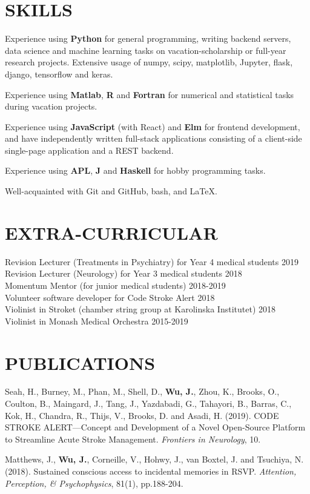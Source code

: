 \documentclass[margin]{res}
\begin{document}
\begin{resume}
\section{SKILLS}

Experience using {\bf Python} for general programming, writing backend servers, data science and machine learning tasks on vacation-scholarship or full-year research projects. Extensive usage of numpy, scipy, matplotlib, Jupyter, flask, django, tensorflow and keras.

Experience using {\bf Matlab}, {\bf R} and {\bf Fortran} for numerical and statistical tasks during vacation projects.

Experience using {\bf JavaScript} (with React) and {\bf Elm} for frontend development, and have independently written full-stack applications consisting of a client-side single-page application and a REST backend.

Experience using {\bf APL}, {\bf J} and {\bf Haskell} for hobby programming tasks.

Well-acquainted with Git and GitHub, bash, and LaTeX.

\clearpage

\section{EXTRA-CURRICULAR}

Revision Lecturer (Treatments in Psychiatry) for Year 4 medical students \hfill 2019 \\
Revision Lecturer (Neurology) for Year 3 medical students \hfill 2018 \\
Momentum Mentor (for junior medical students) \hfill 2018-2019 \\
Volunteer software developer for Code Stroke Alert \hfill 2018 \\
Violinist in Stroket (chamber string group at Karolinska Institutet) \hfill 2018 \\
Violinist in Monash Medical Orchestra \hfill 2015-2019 \\

\section{PUBLICATIONS}

Seah, H., Burney, M., Phan, M., Shell, D., {\bf Wu, J.}, Zhou, K., Brooks, O., Coulton, B., Maingard, J., Tang, J., Yazdabadi, G., Tahayori, B., Barras, C., Kok, H., Chandra, R., Thijs, V., Brooks, D. and Asadi, H. (2019). CODE STROKE ALERT—Concept and Development of a Novel Open-Source Platform to Streamline Acute Stroke Management. {\it Frontiers in Neurology}, 10.

Matthews, J., {\bf Wu, J.}, Corneille, V., Hohwy, J., van Boxtel, J. and Tsuchiya, N. (2018). Sustained conscious access to incidental memories in RSVP. {\it Attention, Perception, \& Psychophysics}, 81(1), pp.188-204. \\

\end{resume}
\end{document}
